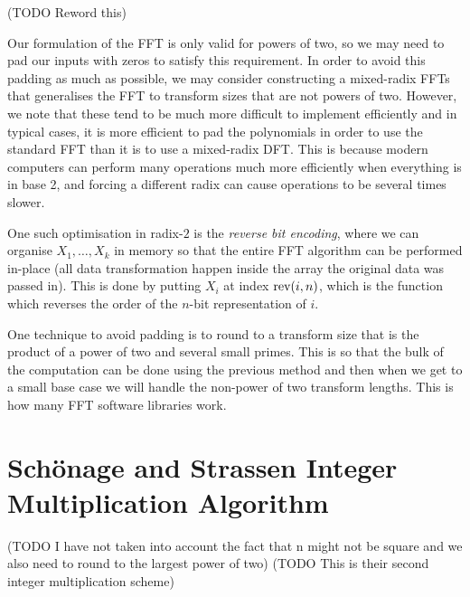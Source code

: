 \begin{remark}
    (TODO Reword this)

    \medskip

    Our formulation of the FFT is only valid for powers of two, so we may need to pad our inputs with zeros to satisfy this requirement. In order to avoid this padding as much as possible, we may consider constructing a mixed-radix FFTs that generalises the FFT to transform sizes that are not powers of two. However, we note that these tend to be much more difficult to implement efficiently and in typical cases, it is more efficient to pad the polynomials in order to use the standard FFT than it is to use a mixed-radix DFT. This is because modern computers can perform many operations much more efficiently when everything is in base 2, and forcing a different radix can cause operations to be several times slower.

    One such optimisation in radix-$2$ is the \emph{reverse bit encoding}, where we can organise $X_1, \ldots, X_k$ in memory so that the entire FFT algorithm can be performed in-place (all data transformation happen inside the array the original data was passed in). This is done by putting $X_i$ at index $\textrm{rev}(i, n)$, which is the function which reverses the order of the $n$-bit representation of $i$.

    One technique to avoid padding is to round to a transform size that is the product of a power of two and several small primes.
    This is so that the bulk of the computation can be done using the previous method and then when we get to a small base case we will handle the non-power of two transform lengths. This is how many FFT software libraries work.
\end{remark}


\section{Sch\"{o}nage and Strassen Integer Multiplication Algorithm}
\label{sec:schon-strass}

(TODO I have not taken into account the fact that n might not be square and we also need to round to the largest power of two)
(TODO This is their second integer multiplication scheme)

